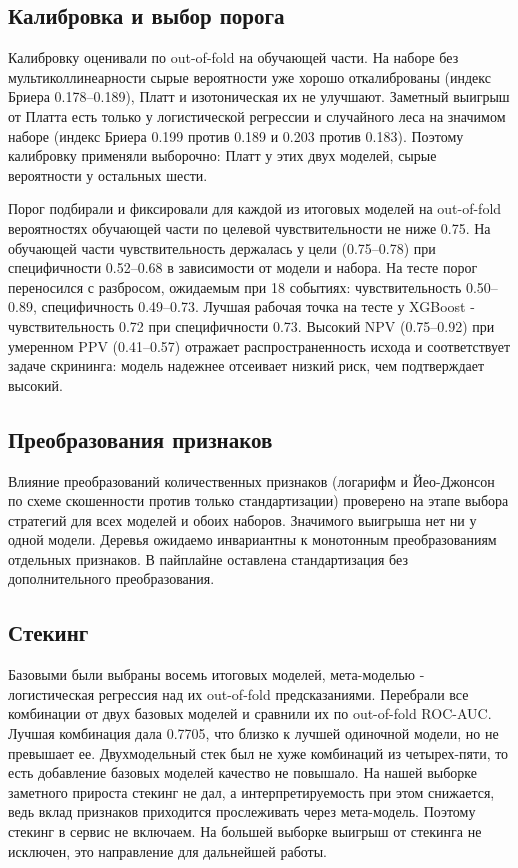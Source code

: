 \documentclass[12pt,a4paper]{article}
\begin{document}
\subsection{Калибровка и выбор порога}

Калибровку оценивали по out-of-fold на обучающей части. На наборе без мультиколлинеарности
сырые вероятности уже хорошо откалиброваны (индекс Бриера 0.178--0.189), Платт и
изотоническая их не улучшают. Заметный выигрыш от Платта есть только у логистической
регрессии и случайного леса на значимом наборе (индекс Бриера 0.199 против 0.189 и 0.203
против 0.183). Поэтому калибровку применяли выборочно: Платт у этих двух моделей, сырые
вероятности у остальных шести.

Порог подбирали и фиксировали для каждой из итоговых моделей на out-of-fold вероятностях
обучающей части по целевой чувствительности не ниже 0.75. На обучающей части
чувствительность держалась у цели (0.75--0.78) при специфичности 0.52--0.68 в зависимости от
модели и набора. На тесте
порог переносился с разбросом, ожидаемым при 18 событиях: чувствительность 0.50--0.89,
специфичность 0.49--0.73. Лучшая рабочая точка на тесте у XGBoost - чувствительность 0.72 при
специфичности 0.73. Высокий NPV (0.75--0.92) при умеренном PPV (0.41--0.57) отражает
распространенность исхода и соответствует задаче скрининга: модель надежнее отсеивает низкий
риск, чем подтверждает высокий.

\subsection{Преобразования признаков}

Влияние преобразований количественных признаков (логарифм и Йео-Джонсон по схеме скошенности
против только стандартизации) проверено на этапе выбора стратегий для всех моделей и обоих
наборов. Значимого выигрыша нет ни у одной модели. Деревья ожидаемо инвариантны к
монотонным преобразованиям отдельных признаков. В пайплайне оставлена стандартизация без
дополнительного преобразования.

\subsection{Стекинг}

Базовыми были выбраны восемь итоговых моделей, мета-моделью - логистическая регрессия над их
out-of-fold предсказаниями. Перебрали все комбинации от двух базовых моделей и сравнили их по
out-of-fold ROC-AUC. Лучшая комбинация дала 0.7705, что близко к лучшей одиночной модели, но
не превышает ее. Двухмодельный стек был не хуже комбинаций из четырех-пяти, то есть
добавление базовых моделей качество не повышало. На нашей выборке заметного прироста стекинг
не дал, а интерпретируемость при этом снижается, ведь вклад признаков приходится прослеживать
через мета-модель. Поэтому стекинг в сервис не включаем. На большей выборке выигрыш от
стекинга не исключен, это направление для дальнейшей работы.
\end{document}
